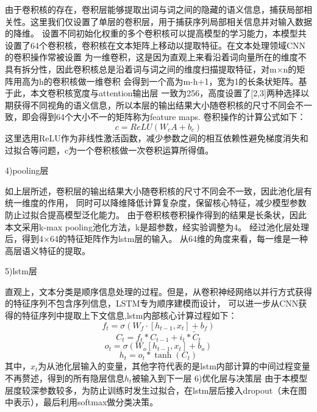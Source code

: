   由于卷积核的存在，卷积层能够提取出词与词之间的隐藏的语义信息，捕获局部相关性。这里我们仅设置了单层的卷积层，用于捕获序列局部相关信息并对输入数据的降维。
  设置不同初始化权重的多个卷积核可以提高模型的学习能力，本模型共设置了64个卷积核，卷积核在文本矩阵上移动以提取特征。在文本处理领域CNN的卷积操作常被设置
  为一维卷积，这是因为直观上来看沿着词向量所在的维度不具有拆分性，因此卷积核总是沿着词与词之间的维度扫描提取特征，对m×n的矩阵用高为h的卷积核做一维卷积
  会得到一个高为m-h+1，宽为1的长条状矩阵。基于此，本文卷积核宽度与attention输出层
  一致为256，高度设置了[2,3]两种选择以期获得不同视角的语义信息，所以本层的输出结果大小随卷积核的尺寸不同会不一致，即会得到64个大小不一的矩阵称为feature maps.
  卷积操作的计算公式如下：
  \begin{equation}
    c=ReLU(W_{c}A+b_{c})
    \end{equation}
    这里选用ReLU作为非线性激活函数，减少参数之间的相互依赖性避免梯度消失和过拟合等问题，c为一个卷积核做一次卷积运算所得值。

  4)pooling层

    如上层所述，卷积层的输出结果大小随卷积核的尺寸不同会不一致，因此池化层有统一维度的作用，
    同时可以降维降低计算复杂度，保留核心特征，减少模型参数防止过拟合提高模型泛化能力。
    由于卷积核卷积操作得到的结果是长条状，因此本文采用k-max pooling池化方法，k是超参数，经实验调整为4。
    经过池化层处理后，得到4×64的特征矩阵作为lstm层的输入。
    从64维的角度来看，每一维是一种高层语义特征的提取。

    5)lstm层

  直观上，文本分类是顺序信息处理的过程。但是，从卷积神经网络以并行方式获得的特征序列不包含序列信息，LSTM专为顺序建模而设计，
  可以进一步从CNN获得的特征序列中提取上下文信息,lstm内部核心计算过程如下：
  \begin{equation}
  f_{t}=σ(W_{f}\cdot[h_{t-1},x_t]+b_{f})
  \end{equation}
  \begin{equation}
    C_{t}=f_{t} * C_{t-1}+i_{t} * \tilde{C}_{t}
    \end{equation} 
    \begin{equation}
      o_{t}=\sigma\left(W_{o}\left[h_{t-1}, x_{t}\right]+b_{o}\right)
    \end{equation} 
    \begin{equation}
      h_{t}=o_{t} * \tanh \left(C_{t}\right)
    \end{equation}
    其中，$x_t$为从池化层输入的变量，其他字符代表的是lstm内部计算的中间过程变量不再赘述，得到的所有隐层信息$h_t$被输入到下一层
  6)优化层与决策层
    由于本模型层度较深参数较多，为防止训练时发生过拟合，在lstm层后接入dropout（未在图中表示），最后利用softmax做分类决策。

